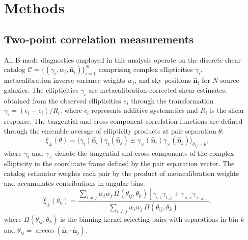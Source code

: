 \documentclass{aa}
\begin{document}

\section{Methods}

\subsection{Two-point correlation measurements}

All B-mode diagnostics employed in this analysis operate on the discrete shear catalog $\mathcal{C} = \{(\gamma_i, w_i, \hat{\mathbf{n}}_i)\}_{i=1}^N$ comprising complex ellipticities $\gamma_i$, metacalibration inverse-variance weights $w_i$, and sky positions $\hat{\mathbf{n}}_i$ for $N$ source galaxies. The ellipticities $\gamma_i$ are metacalibration-corrected shear estimates, obtained from the observed ellipticities $e_i$ through the transformation $\gamma_i = (e_i - c_i)/R_i$, where $c_i$ represents additive systematics and $R_i$ is the shear response. The tangential and cross-component correlation functions are defined through the ensemble average of ellipticity products at pair separation $\theta$:
\begin{equation}
\xi_\pm(\theta) = \langle \gamma_{\mathrm{t}}(\hat{\mathbf{n}}_i) \gamma_{\mathrm{t}}(\hat{\mathbf{n}}_j) \pm \gamma_{\times}(\hat{\mathbf{n}}_i) \gamma_{\times}(\hat{\mathbf{n}}_j) \rangle_{\theta_{ij} = \theta},
\end{equation}
where $\gamma_{\mathrm{t}}$ and $\gamma_{\times}$ denote the tangential and cross components of the complex ellipticity in the coordinate frame defined by the pair separation vector. The catalog estimator weights each pair by the product of metacalibration weights and accumulates contributions in angular bins:
\begin{equation}
\hat{\xi}_\pm(\theta_k) = \frac{\sum_{i \neq j} w_i w_j \, \Pi(\theta_{ij}, \theta_k) \left[\gamma_{\mathrm{t},i} \gamma_{\mathrm{t},j} \pm \gamma_{\times,i} \gamma_{\times,j}\right]}{\sum_{i \neq j} w_i w_j \, \Pi(\theta_{ij}, \theta_k)},
\label{eq:xi_estimator}
\end{equation}
where $\Pi(\theta_{ij}, \theta_k)$ is the binning kernel selecting pairs with separations in bin $k$ and $\theta_{ij} = \arccos(\hat{\mathbf{n}}_i \cdot \hat{\mathbf{n}}_j)$.
\end{document}

